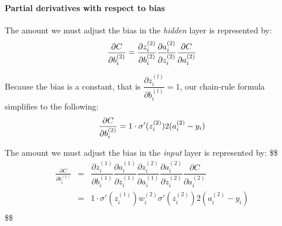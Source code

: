 \hypertarget{partial-derivatives-with-respect-to-bias}{%
\paragraph{Partial derivatives with respect to
bias}\label{partial-derivatives-with-respect-to-bias}}

The amount we must adjust the bias in the \emph{hidden} layer is
represented by: \[
\frac{\partial{C}}{\partial{b_i^{(2)}}}  =  \dfrac{\partial{z_i^{(2)}}}{\partial{b_i^{(2)}}}
     \dfrac{\partial{a_i^{(2)}}}{\partial{z_i^{(2)}}}
     \dfrac{\partial{C}}{\partial{a_i^{(2)}}} \\
\]

Because the bias is a constant, that is
\(\dfrac{\partial{z_i^{(l)}}}{\partial{b_i^{(l)}}} = 1\), our chain-rule
formula simplifies to the following: \[
\frac{\partial{C}}{\partial{b_i^{(2)}}} = 1 \cdot \sigma'(z_i^{(2)}) 2(a_i^{(2)}-y_i) \\
\]

The amount we must adjust the bias in the \emph{input} layer is
represented by: \$\$ \begin{eqnarray}
\frac{\partial{C}}{\partial{b_i^{(1)}}}    &=& \dfrac{\partial{z_i^{(1)}}}{\partial{b_i^{(1)}}} \dfrac{\partial{a_i^{(1)}}}{\partial{z_i^{(1)}}}  \dfrac{\partial{z_i^{(2)}}}{\partial{a_i^{(1)}}}
     \dfrac{\partial{a_i^{(2)}}}{\partial{z_i^{(2)}}}
     \dfrac{\partial{C}}{\partial{a_i^{(2)}}} \\
     
&=& 1 \cdot \sigma'(z_i^{(1)}) w_i^{(2)} \sigma'(z_i^{(2)}) 2(a_i^{(2)}-y_i) \\

\end{eqnarray} \$\$

